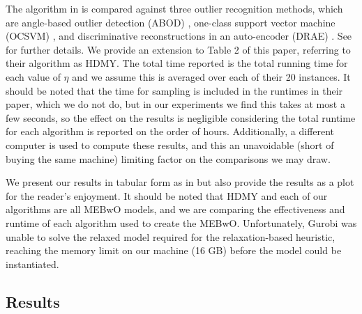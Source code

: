 \documentclass[11pt,twoside]{report}
\theoremstyle{definition}
\numberwithin{theorem}{section}
\numberwithin{definition}{section}
\numberwithin{lemma}{section}
\numberwithin{proposition}{section}
\numberwithin{equation}{section}
\numberwithin{figure}{section}
\begin{document}
The algorithm in \cite{huding} is compared against three outlier recognition methods, which are angle-based outlier detection (ABOD) \cite{abod}, one-class support vector machine (OCSVM) \cite{ocsvm}, and discriminative reconstructions in an auto-encoder (DRAE) \cite{drae}. See \cite{huding} for further details. We provide an extension to Table 2 of this paper, referring to their algorithm as HDMY. The total time reported is the total running time for each value of $\eta$ and we assume this is averaged over each of their 20 instances. It should be noted that the time for sampling is included in the runtimes in their paper, which we do not do, but in our experiments we find this takes at most a few seconds, so the effect on the results is negligible considering the total runtime for each algorithm is reported on the order of hours. Additionally, a different computer is used to compute these results, and this an unavoidable (short of buying the same machine) limiting factor on the comparisons we may draw.

We present our results in tabular form as in \cite{huding} but also provide the results as a plot for the reader's enjoyment. It should be noted that HDMY and each of our algorithms are all MEBwO models, and we are comparing the effectiveness and runtime of each algorithm used to create the MEBwO. Unfortunately, Gurobi was unable to solve the relaxed model required for the relaxation-based heuristic, reaching the memory limit on our machine (16 GB) before the model could be instantiated.

\subsection{Results}
\end{document}

